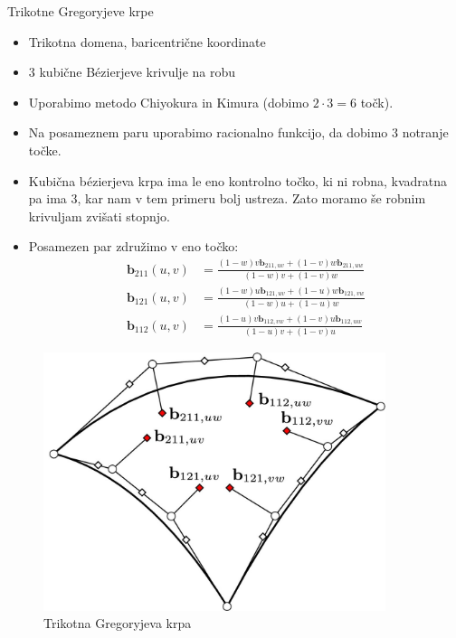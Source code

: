 \documentclass[a4paper,8pt]{beamer}
\newcommand{\tbf}{\textbf}
\begin{document}
\begin{frame}{Trikotne Gregoryjeve krpe}
	\begin{itemize}
		\item Trikotna domena, baricentrične koordinate
		\item 3 kubične Bézierjeve krivulje na robu
		\item Uporabimo metodo Chiyokura in Kimura (dobimo $2 \cdot 3 = 6$ točk).
		\item Na posameznem paru uporabimo racionalno funkcijo, da dobimo 3 notranje točke.
		\item Kubična bézierjeva krpa ima le eno kontrolno točko, ki ni robna, kvadratna pa ima 3, kar nam v tem primeru bolj ustreza. Zato moramo še robnim krivuljam zvišati stopnjo.
		\item Posamezen par združimo v eno točko:
		\begin{align*}
		\tbf{b}_{211} (u, v) &= \frac{(1-w)v \tbf{b}_{211,uv}+(1-v)w\tbf{b}_{211,uw}}{(1-w)v+(1-v)w} \\
		\tbf{b}_{121} (u, v) &= \frac{(1-w)u \tbf{b}_{121,uv}+(1-u)w\tbf{b}_{121,vw}}{(1-w)u+(1-u)w} \\
		\tbf{b}_{112} (u, v) &= \frac{(1-u)v \tbf{b}_{112,vw}+(1-v)u\tbf{b}_{112,uw}}{(1-u)v+(1-v)u} 
		\end{align*}
	\end{itemize}
\end{frame}
\begin{frame}
	\begin{figure}[h]
		\centering
		\includegraphics[width=10cm]{gregory_krpe_trikotna.jpg}
		\caption{Trikotna Gregoryjeva krpa}
	\end{figure}
\end{frame}
\end{document}
